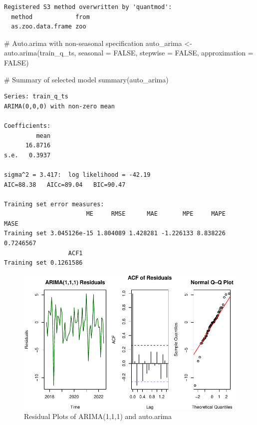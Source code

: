 \documentclass[
  11pt,
]{article}
\newenvironment{Shaded}{\begin{snugshade}}{\end{snugshade}}
\newcommand{\AttributeTok}[1]{\textcolor[rgb]{0.40,0.45,0.13}{#1}}
\newcommand{\CommentTok}[1]{\textcolor[rgb]{0.37,0.37,0.37}{#1}}
\newcommand{\ConstantTok}[1]{\textcolor[rgb]{0.56,0.35,0.01}{#1}}
\newcommand{\FunctionTok}[1]{\textcolor[rgb]{0.28,0.35,0.67}{#1}}
\newcommand{\NormalTok}[1]{\textcolor[rgb]{0.00,0.23,0.31}{#1}}
\newcommand{\OtherTok}[1]{\textcolor[rgb]{0.00,0.23,0.31}{#1}}
\begin{document}
\begin{verbatim}
Registered S3 method overwritten by 'quantmod':
  method            from
  as.zoo.data.frame zoo 
\end{verbatim}

\begin{Shaded}
\begin{Highlighting}[]
\CommentTok{\# Auto.arima with non{-}seasonal specification}
\NormalTok{auto\_arima }\OtherTok{\textless{}{-}} \FunctionTok{auto.arima}\NormalTok{(train\_q\_ts, }\AttributeTok{seasonal =} \ConstantTok{FALSE}\NormalTok{, }\AttributeTok{stepwise =} \ConstantTok{FALSE}\NormalTok{,}
                         \AttributeTok{approximation =} \ConstantTok{FALSE}\NormalTok{)}

\CommentTok{\# Summary of selected model}
\FunctionTok{summary}\NormalTok{(auto\_arima)}
\end{Highlighting}
\end{Shaded}

\begin{verbatim}
Series: train_q_ts 
ARIMA(0,0,0) with non-zero mean 

Coefficients:
         mean
      16.8716
s.e.   0.3937

sigma^2 = 3.417:  log likelihood = -42.19
AIC=88.38   AICc=89.04   BIC=90.47

Training set error measures:
                       ME     RMSE      MAE       MPE     MAPE      MASE
Training set 3.045126e-15 1.804089 1.428281 -1.226133 8.838226 0.7246567
                  ACF1
Training set 0.1261586
\end{verbatim}

\begin{figure}[H]

{\centering \includegraphics{project_files/figure-pdf/fig-residplots-1.pdf}

}

\caption{Residual Plots of ARIMA(1,1,1) and auto.arima}

\end{figure}%
\end{document}
